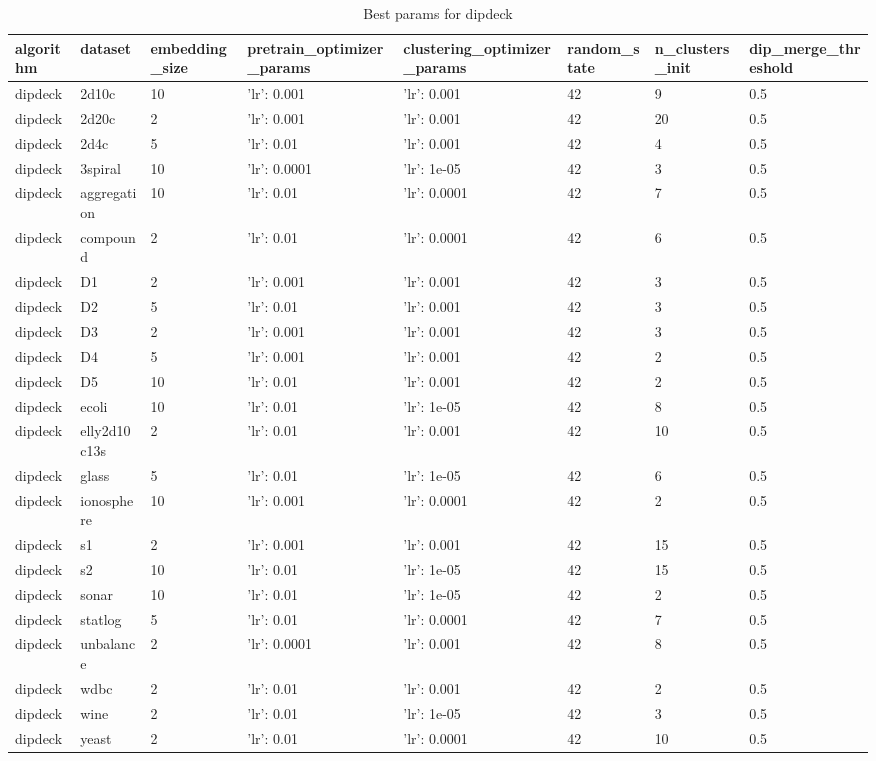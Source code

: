 \begin{table}[H]
\centering
\caption{Best params for dipdeck}
\label{tab:params:dipdeck}
\begin{tabular}{|l|l|l|l|l|l|l|l|}
\hline
algorithm & dataset & embedding\_size & pretrain\_optimizer\_params & clustering\_optimizer\_params & random\_state & n\_clusters\_init & dip\_merge\_threshold \\
\hline
dipdeck & 2d10c & 10 & {'lr': 0.001} & {'lr': 0.001} & 42 & 9 & 0.5 \\
\hline
dipdeck & 2d20c & 2 & {'lr': 0.001} & {'lr': 0.001} & 42 & 20 & 0.5 \\
\hline
dipdeck & 2d4c & 5 & {'lr': 0.01} & {'lr': 0.001} & 42 & 4 & 0.5 \\
\hline
dipdeck & 3spiral & 10 & {'lr': 0.0001} & {'lr': 1e-05} & 42 & 3 & 0.5 \\
\hline
dipdeck & aggregation & 10 & {'lr': 0.01} & {'lr': 0.0001} & 42 & 7 & 0.5 \\
\hline
dipdeck & compound & 2 & {'lr': 0.01} & {'lr': 0.0001} & 42 & 6 & 0.5 \\
\hline
dipdeck & D1 & 2 & {'lr': 0.001} & {'lr': 0.001} & 42 & 3 & 0.5 \\
\hline
dipdeck & D2 & 5 & {'lr': 0.01} & {'lr': 0.001} & 42 & 3 & 0.5 \\
\hline
dipdeck & D3 & 2 & {'lr': 0.001} & {'lr': 0.001} & 42 & 3 & 0.5 \\
\hline
dipdeck & D4 & 5 & {'lr': 0.001} & {'lr': 0.001} & 42 & 2 & 0.5 \\
\hline
dipdeck & D5 & 10 & {'lr': 0.01} & {'lr': 0.001} & 42 & 2 & 0.5 \\
\hline
dipdeck & ecoli & 10 & {'lr': 0.01} & {'lr': 1e-05} & 42 & 8 & 0.5 \\
\hline
dipdeck & elly2d10c13s & 2 & {'lr': 0.01} & {'lr': 0.001} & 42 & 10 & 0.5 \\
\hline
dipdeck & glass & 5 & {'lr': 0.01} & {'lr': 1e-05} & 42 & 6 & 0.5 \\
\hline
dipdeck & ionosphere & 10 & {'lr': 0.001} & {'lr': 0.0001} & 42 & 2 & 0.5 \\
\hline
dipdeck & s1 & 2 & {'lr': 0.001} & {'lr': 0.001} & 42 & 15 & 0.5 \\
\hline
dipdeck & s2 & 10 & {'lr': 0.01} & {'lr': 1e-05} & 42 & 15 & 0.5 \\
\hline
dipdeck & sonar & 10 & {'lr': 0.01} & {'lr': 1e-05} & 42 & 2 & 0.5 \\
\hline
dipdeck & statlog & 5 & {'lr': 0.01} & {'lr': 0.0001} & 42 & 7 & 0.5 \\
\hline
dipdeck & unbalance & 2 & {'lr': 0.0001} & {'lr': 0.001} & 42 & 8 & 0.5 \\
\hline
dipdeck & wdbc & 2 & {'lr': 0.01} & {'lr': 0.001} & 42 & 2 & 0.5 \\
\hline
dipdeck & wine & 2 & {'lr': 0.01} & {'lr': 1e-05} & 42 & 3 & 0.5 \\
\hline
dipdeck & yeast & 2 & {'lr': 0.01} & {'lr': 0.0001} & 42 & 10 & 0.5 \\
\hline
\end{tabular}
\end{table}